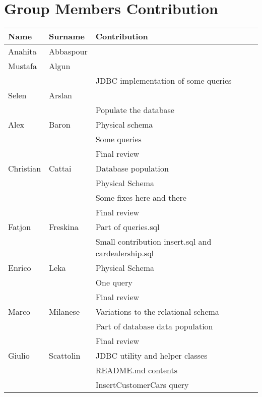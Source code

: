 \documentclass{article}
\begin{document}
\maketitle







\section{Group Members Contribution}

\begin{longtable}{|p{}|p{}|p{}|}
        \hline
        \textbf{Name} & \textbf{Surname} & \textbf{Contribution} \\
        \hline \hline
        Anahita & Abbaspour & \\
        \hline
        Mustafa & Algun & \\
		& & JDBC implementation of some queries \\
        \hline
        Selen & Arslan & \\
        & & Populate the database \\
        \hline
        Alex & Baron & Physical schema\\
        & & Some queries \\
        & & Final review \\
        \hline
        Christian & Cattai & Database population \\
        & & Physical Schema \\
        & & Some fixes here and there \\
        & & Final review \\
        \hline
        Fatjon & Freskina & Part of queries.sql \\
        & & Small contribution insert.sql and cardealership.sql \\
        \hline
        Enrico & Leka & Physical Schema \\
        & & One query \\
        & & Final review \\
        \hline
        Marco & Milanese & Variations to the relational schema \\
        & & Part of database data population \\
        & & Final review \\
        \hline
        Giulio & Scattolin & JDBC utility and helper classes \\
               &           & README.md contents \\
               &           & InsertCustomerCars query \\
        \hline
\end{longtable}
\end{document}
